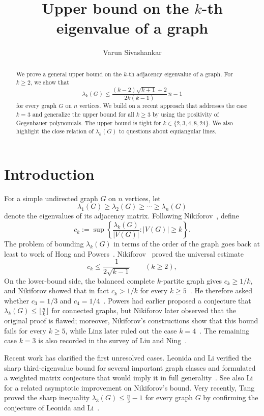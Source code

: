 \documentclass[12pt]{amsart}
\title{Upper bound on the $k$-th eigenvalue of a graph}
\author{Varun Sivashankar}
\date{}
\theoremstyle{myremark}
\newcommand{\1}{\mathbf{1}}
\begin{document}
\begin{abstract}
We prove a general upper bound on the $k$-th adjacency eigenvalue of a graph. For $k\ge 2$, we show that
\[
\lambda_k(G)\le \frac{(k-2)\sqrt{k+1}+2}{2k(k-1)}\,n-1
\]
for every graph $G$ on $n$ vertices. We build on a recent approach that addresses the case $k=3$ and generalize the upper bound for all $k \geq 3$ by using the positivity of Gegenbauer polynomials. The upper bound is tight for $k \in \{2,3,4,8,24\}$. We also highlight the close relation of $\lambda_k(G)$ to questions about equiangular lines.
\end{abstract}

\maketitle

\section{Introduction}

For a simple undirected graph $G$ on $n$ vertices, let
\[
\lambda_1(G)\ge \lambda_2(G)\ge \cdots\ge \lambda_n(G)
\]
denote the eigenvalues of its adjacency matrix. Following Nikiforov~\cite{Nikiforov15}, define
\[
 c_k:=\sup\left\{\frac{\lambda_k(G)}{|V(G)|}: |V(G)|\ge k\right\}.
\]
The problem of bounding $\lambda_k(G)$ in terms of the order of the graph goes back at least to work of Hong and Powers~\cite{Hong88,Hong93,Powers89}. Nikiforov~\cite{Nikiforov15} proved the universal estimate
\[
 c_k\le \frac{1}{2\sqrt{k-1}}\qquad (k\ge 2),
\]
On the lower-bound side, the balanced complete $k$-partite graph gives $c_k\ge 1/k$, and Nikiforov showed that in fact $c_k>1/k$ for every $k\ge 5$~\cite{Nikiforov15}. He therefore asked whether $c_3=1/3$ and $c_4=1/4$~\cite[Question~2.11]{Nikiforov15}. Powers had earlier proposed a conjecture that $\lambda_k(G) \leq \lfloor \frac{n}{k} \rfloor$ for connected graphs, but Nikiforov later observed that the original proof is flawed; moreover, Nikiforov's constructions show that this bound fails for every $k\ge 5$, while Linz later ruled out the case $k=4$~\cite{Powers89,Nikiforov15,Linz23}. The remaining case $k=3$ is also recorded in the survey of Liu and Ning~\cite[Problem~10]{LiuNing23}.

Recent work has clarified the first unresolved cases. Leonida and Li verified the sharp third-eigenvalue bound for several important graph classes and formulated a weighted matrix conjecture that would imply it in full generality~\cite{LeonidaLi25}. See also Li~\cite{Li25} for a related asymptotic improvement on Nikiforov's bound. Very recently, Tang proved the sharp inequality
$\lambda_3(G)\le \frac n3-1$ for every graph $G$ by confirming the conjecture of Leonida and Li~\cite{Tang26}. 
\end{document}
